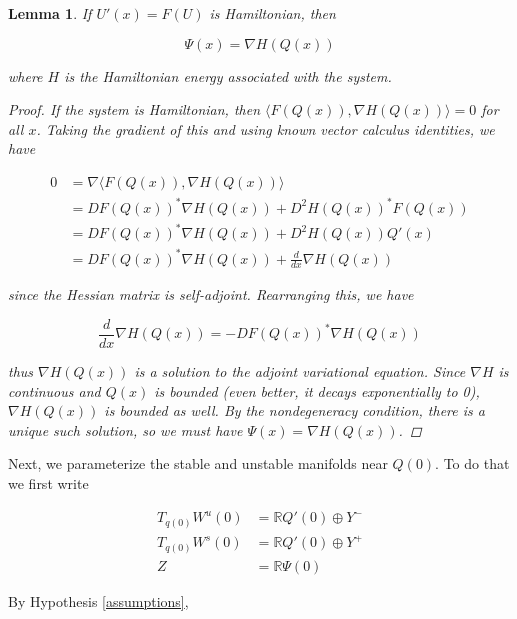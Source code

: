 \documentclass[12pt]{article}
\def\R{{\mathbb R}}
\newtheorem{lemma}{Lemma}
\begin{document}
\begin{lemma}

If $U'(x) = F(U)$ is Hamiltonian, then

\begin{equation}
\Psi(x) = \nabla H(Q(x))
\end{equation}

where $H$ is the Hamiltonian energy associated with the system.

\begin{proof}

If the system is Hamiltonian, then $\langle F(Q(x)), \nabla H(Q(x)) \rangle = 0$ for all $x$. Taking the gradient of this and using known vector calculus identities, we have

\begin{align*}
0 &= \nabla \langle F(Q(x)), \nabla H(Q(x)) \rangle \\
&= D F(Q(x))^* \nabla H(Q(x)) + D^2 H(Q(x))^* F(Q(x)) \\
&= D F(Q(x))^* \nabla H(Q(x)) + D^2 H(Q(x)) Q'(x) \\
&= D F(Q(x))^* \nabla H(Q(x)) + \frac{d}{dx} \nabla H(Q(x))
\end{align*}

since the Hessian matrix is self-adjoint. Rearranging this, we have

\begin{equation}
\frac{d}{dx} \nabla H(Q(x)) = -D F(Q(x))^* \nabla H(Q(x)) 
\end{equation}

thus $\nabla H(Q(x))$ is a solution to the adjoint variational equation. Since $\nabla H$ is continuous and $Q(x)$ is bounded (even better, it decays exponentially to 0), $\nabla H(Q(x))$ is bounded as well. By the nondegeneracy condition, there is a unique such solution, so we must have $\Psi(x) = \nabla H(Q(x))$.

\end{proof}
\end{lemma}

Next, we parameterize the stable and unstable manifolds near $Q(0)$. To do that we first write

\begin{align*}
T_{q(0)}W^u(0) &= \R Q'(0) \oplus Y^- \\
T_{q(0)}W^s(0) &= \R Q'(0) \oplus Y^+ \\
Z &= \R \Psi(0)
\end{align*}

By Hypothesis \ref{assumptions},
\end{document}
